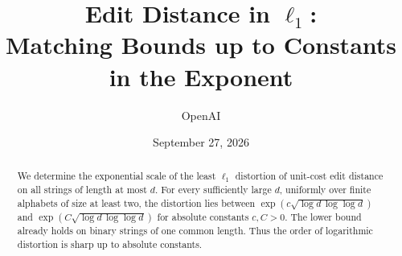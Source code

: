 \documentclass[11pt]{article}
\title{Edit Distance in \texorpdfstring{$\ell_1$}{l1}:\\
Matching Bounds up to Constants in the Exponent}
\author{OpenAI}
\date{September 27, 2026}
\theoremstyle{remark}
\numberwithin{equation}{section}
\begin{document}
\maketitle
\begin{abstract}
We determine the exponential scale of the least $\ell_1$ distortion of
unit-cost edit distance on all strings of length at most $d$. For every
sufficiently large $d$, uniformly over finite alphabets of size at least
two, the distortion lies between
$\exp(c\sqrt{\log d\,\log\log d})$ and
$\exp(C\sqrt{\log d\,\log\log d})$ for absolute constants $c,C>0$.
The lower bound already holds on binary strings of one common length.
Thus the order of logarithmic distortion is sharp up to absolute constants.
\end{abstract}







\end{document}
